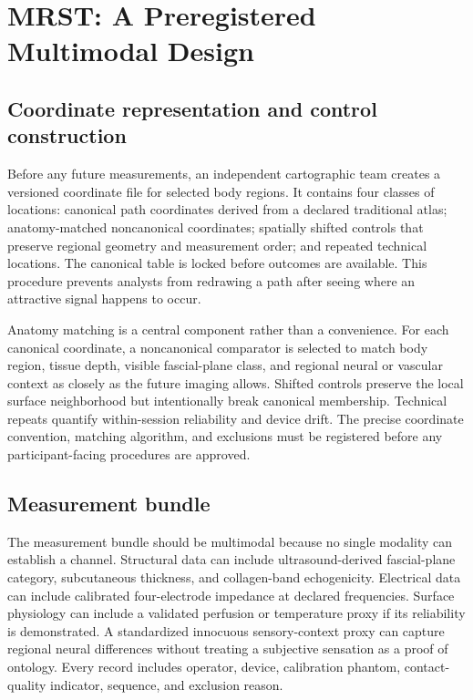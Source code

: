 \documentclass[conference]{IEEEtran}
\begin{document}
\section{MRST: A Preregistered Multimodal Design}

\subsection{Coordinate representation and control construction}

Before any future measurements, an independent cartographic team creates a versioned coordinate file for selected body regions. It contains four classes of locations: canonical path coordinates derived from a declared traditional atlas; anatomy-matched noncanonical coordinates; spatially shifted controls that preserve regional geometry and measurement order; and repeated technical locations. The canonical table is locked before outcomes are available. This procedure prevents analysts from redrawing a path after seeing where an attractive signal happens to occur.

Anatomy matching is a central component rather than a convenience. For each canonical coordinate, a noncanonical comparator is selected to match body region, tissue depth, visible fascial-plane class, and regional neural or vascular context as closely as the future imaging allows. Shifted controls preserve the local surface neighborhood but intentionally break canonical membership. Technical repeats quantify within-session reliability and device drift. The precise coordinate convention, matching algorithm, and exclusions must be registered before any participant-facing procedures are approved.

\subsection{Measurement bundle}

The measurement bundle should be multimodal because no single modality can establish a channel. Structural data can include ultrasound-derived fascial-plane category, subcutaneous thickness, and collagen-band echogenicity. Electrical data can include calibrated four-electrode impedance at declared frequencies. Surface physiology can include a validated perfusion or temperature proxy if its reliability is demonstrated. A standardized innocuous sensory-context proxy can capture regional neural differences without treating a subjective sensation as a proof of ontology. Every record includes operator, device, calibration phantom, contact-quality indicator, sequence, and exclusion reason.
\end{document}
